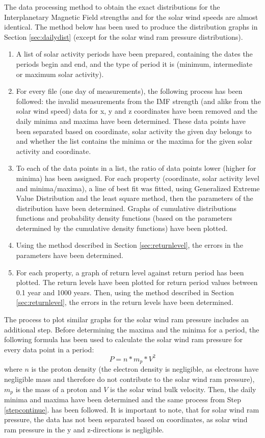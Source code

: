\documentclass[11pt]{article}
\begin{document}
        The data processing method to obtain the exact distributions for the Interplanetary Magnetic Field strengths and for the solar wind speeds are almost identical. The method below has been used to produce the distribution graphs in Section \ref{sec:dailydist} (except for the solar wind ram pressure distributions).
        \begin{enumerate}
            \item A list of solar activity periods have been prepared, containing the dates the periods begin and end, and the type of period it is (minimum, intermediate or maximum solar activity).
            \item For every file (one day of measurements), the following process has been followed: the invalid measurements from the IMF strength (and alike from the solar wind speed) data for x, y and z coordinates have been removed and the daily minima and maxima have been determined. These data points have been separated based on coordinate, solar activity the given day belongs to and whether the list contains the minima or the maxima for the given solar activity and coordinate.\label{stepcontinue}
            \item To each of the data points in a list, the ratio of data points lower (higher for minima) has been assigned. For each property (coordinate, solar activity level and minima/maxima), a line of best fit was fitted, using Generalized Extreme Value Distribution and the least square method, then the parameters of the distribution have been determined. Graphs of cumulative distributions functions and probability density functions (based on the parameters determined by the cumulative density functions) have been plotted.
            \item Using the method described in Section \ref{sec:returnlevel}, the errors in the parameters have been determined.
            \item For each property, a graph of return level against return period has been plotted. The return levels have been plotted for return period values between 0.1 year and 1000 years. Then, using the method described in Section \ref{sec:returnlevel}, the errors in the return levels have been determined.
        \end{enumerate}
        The process to plot similar graphs for the solar wind ram pressure includes an additional step. Before determining the maxima and the minima for a period, the following formula has been used to calculate the solar wind ram pressure for every data point in a period:
        \begin{equation}
            P=n*m_p*V^2
        \end{equation}
        where $n$ is the proton density (the electron density is negligible, as electrons have negligible mass and therefore do not contribute to the solar wind ram pressure), $m_p$ is the mass of a proton and $V$ is the solar wind bulk velocity. Then, the daily minima and maxima have been determined and the same process from Step \ref{stepcontinue}. has been followed. It is important to note, that for solar wind ram pressure, the data has not been separated based on coordinates, as solar wind ram pressure in the y and z-directions is negligible.
\end{document}
